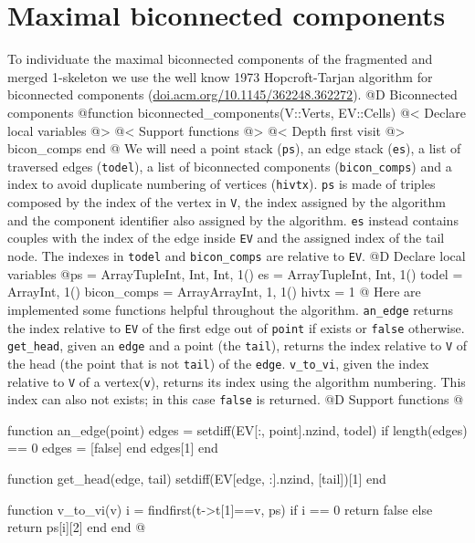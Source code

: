 \documentclass[10pt,oneside]{article}
\begin{document}
\section{Maximal biconnected components}
To individuate the maximal biconnected components of the fragmented and merged 1-skeleton
we use the well know 1973 Hopcroft-Tarjan algorithm for biconnected components (\url{doi.acm.org/10.1145/362248.362272}).
@D Biconnected components
@{function biconnected_components(V::Verts, EV::Cells)
    @< Declare local variables @>
    @< Support functions @>
    @< Depth first visit @>
    bicon_comps
end
@}
We will need a point stack (\texttt{ps}), an edge stack (\texttt{es}), a list of traversed edges (\texttt{todel}), 
a list of biconnected components (\texttt{bicon\_comps}) and a index to avoid duplicate numbering of vertices (\texttt{hivtx}).
\texttt{ps} is made of triples composed by the index of the vertex in \texttt{V}, the index assigned by the algorithm 
and the component identifier also assigned by the algorithm. \texttt{es} instead contains couples with the index of 
the edge inside \texttt{EV} and the assigned index of the tail node. The indexes in \texttt{todel} and \texttt{bicon\_comps}
are relative to \texttt{EV}.
@D Declare local variables
@{ps = Array{Tuple{Int, Int, Int}, 1}()
es = Array{Tuple{Int, Int}, 1}()
todel = Array{Int, 1}()
bicon_comps = Array{Array{Int, 1}, 1}()
hivtx = 1
@}
Here are implemented some functions helpful throughout the algorithm.
\texttt{an\_edge} returns the index relative to \texttt{EV} of the first edge out of \texttt{point} if exists or \texttt{false} otherwise.
\texttt{get\_head}, given an \texttt{edge} and a point (the \texttt{tail}), returns the index relative 
to \texttt{V} of the head (the point that is not \texttt{tail}) of the \texttt{edge}. 
\texttt{v\_to\_vi}, given the index relative to \texttt{V} of a vertex(\texttt{v}), returns its index using the algorithm numbering.
This index can also not exists; in this case \texttt{false} is returned.
@D Support functions
@{function an_edge(point)
    edges = setdiff(EV[:, point].nzind, todel)
    if length(edges) == 0
        edges = [false]
    end
    edges[1]
end

function get_head(edge, tail)
    setdiff(EV[edge, :].nzind, [tail])[1]
end

function v_to_vi(v)
    i = findfirst(t->t[1]==v, ps)
    if i == 0
        return false
    else
        return ps[i][2]
    end
end
@}
\end{document}
